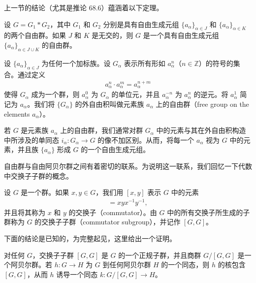 \documentclass[../../main.tex]{subfiles}
\begin{document}
上一节的结论（尤其是推论 68.6）蕴涵着以下定理。

\begin{theorem}\label{theorem:ch11-free-product-of-free-groups}
设 $G=G_1*G_2$，其中 $G_1$ 和 $G_2$ 分别是具有自由生成元组 $\{a_\alpha\}_{\alpha\in J}$ 和 $\{a_\alpha\}_{\alpha\in K}$ 的两个自由群。如果 $J$ 和 $K$ 是无交的，则 $G$ 是一个具有自由生成元组 $\{a_\alpha\}_{\alpha\in J\cup K}$ 的自由群。
\end{theorem}

\begin{definition}[元素族上的自由群]\label{definition:ch11-free-group-on-elements}
设 $\{a_\alpha\}_{\alpha\in J}$ 为任何一个加标族。设 $G_\alpha$ 表示所有形如 $a_\alpha^n$（$n\in\mathbb{Z}$）的符号的集合。通过定义
\begin{align*}
a_\alpha^n\cdot a_\alpha^m=a_\alpha^{n+m}
\end{align*}
使得 $G_\alpha$ 成为一个群，则 $a_\alpha^0$ 为 $G_\alpha$ 的单位元，并且 $a_\alpha^{-n}$ 为 $a_\alpha^n$ 的逆元。将 $a_\alpha^1$ 简记为 $a_\alpha$。我们将 $\{G_\alpha\}$ 的外自由积叫做元素族 $a_\alpha$ 上的自由群（free group on the elements $a_\alpha$）。
\end{definition}

若 $G$ 是元素族 $a_\alpha$ 上的自由群，我们通常对群 $G_\alpha$ 中的元素与其在外自由积构造中所涉及的单同态 $i_\alpha:G_\alpha\to G$ 的像不加区别。从而，将每一个 $a_\alpha$ 视为 $G$ 中的元素，并且族 $\{a_\alpha\}$ 形成 $G$ 的一个自由生成元组。

自由群与自由阿贝尔群之间有着密切的联系。为说明这一联系，我们回忆一下代数中交换子子群的概念。

\begin{definition}[交换子与交换子子群]\label{definition:ch11-commutator}
设 $G$ 是一个群。如果 $x,y\in G$，我们用 $[x,y]$ 表示 $G$ 中的元素
\begin{align*}
[x,y]=xyx^{-1}y^{-1},
\end{align*}
并且将其称为 $x$ 和 $y$ 的交换子（commutator）。由 $G$ 中的所有交换子所生成的子群称为 $G$ 的交换子子群（commutator subgroup），并记作 $[G,G]$。
\end{definition}

下面的结论是已知的，为完整起见，这里给出一个证明。

\begin{theorem}[交换子子群的性质]\label{theorem:ch11-commutator-subgroup}
对任何 $G$，交换子子群 $[G,G]$ 是 $G$ 的一个正规子群，并且商群 $G/[G,G]$ 是一个阿贝尔群。若 $h:G\to H$ 为 $G$ 到任何阿贝尔群 $H$ 的一个同态，则 $h$ 的核包含 $[G,G]$，从而 $h$ 诱导一个同态 $k:G/[G,G]\to H$。
\end{theorem}
\end{document}
